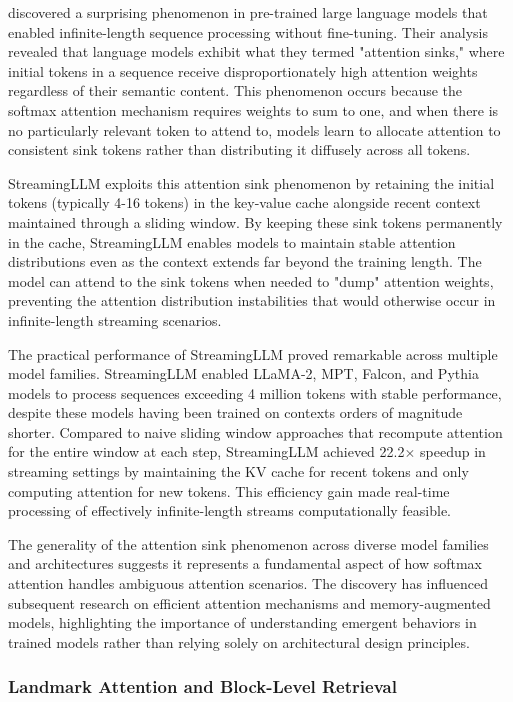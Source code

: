 \citet{xiao2024efficient} discovered a surprising phenomenon in pre-trained large language models that enabled infinite-length sequence processing without fine-tuning. Their analysis revealed that language models exhibit what they termed "attention sinks," where initial tokens in a sequence receive disproportionately high attention weights regardless of their semantic content. This phenomenon occurs because the softmax attention mechanism requires weights to sum to one, and when there is no particularly relevant token to attend to, models learn to allocate attention to consistent sink tokens rather than distributing it diffusely across all tokens.

StreamingLLM exploits this attention sink phenomenon by retaining the initial tokens (typically 4-16 tokens) in the key-value cache alongside recent context maintained through a sliding window. By keeping these sink tokens permanently in the cache, StreamingLLM enables models to maintain stable attention distributions even as the context extends far beyond the training length. The model can attend to the sink tokens when needed to "dump" attention weights, preventing the attention distribution instabilities that would otherwise occur in infinite-length streaming scenarios.

The practical performance of StreamingLLM proved remarkable across multiple model families. StreamingLLM enabled LLaMA-2, MPT, Falcon, and Pythia models to process sequences exceeding 4 million tokens with stable performance, despite these models having been trained on contexts orders of magnitude shorter. Compared to naive sliding window approaches that recompute attention for the entire window at each step, StreamingLLM achieved 22.2$\times$ speedup in streaming settings by maintaining the KV cache for recent tokens and only computing attention for new tokens. This efficiency gain made real-time processing of effectively infinite-length streams computationally feasible.

The generality of the attention sink phenomenon across diverse model families and architectures suggests it represents a fundamental aspect of how softmax attention handles ambiguous attention scenarios. The discovery has influenced subsequent research on efficient attention mechanisms and memory-augmented models, highlighting the importance of understanding emergent behaviors in trained models rather than relying solely on architectural design principles.

\subsubsection{Landmark Attention and Block-Level Retrieval}

